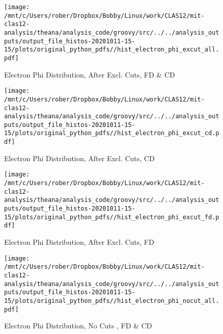 \documentclass{article}
\begin{document}
\begin{landscape}

    \begin{figure}[h]
        \centering

        \texttt{[image: /mnt/c/Users/rober/Dropbox/Bobby/Linux/work/CLAS12/mit-clas12-analysis/theana/analysis\_code/groovy/src/../../analysis\_outputs/output\_file\_histos-20201011-15-15/plots/original\_python\_pdfs//hist\_electron\_phi\_excut\_all.pdf]}
        \captionsetup{textformat=empty,labelformat=blank}
        \caption{Electron Phi Distribution, After Excl. Cuts, FD \& CD}
    \end{figure}
    \clearpage
    
    \begin{figure}[h]
        \centering

        \texttt{[image: /mnt/c/Users/rober/Dropbox/Bobby/Linux/work/CLAS12/mit-clas12-analysis/theana/analysis\_code/groovy/src/../../analysis\_outputs/output\_file\_histos-20201011-15-15/plots/original\_python\_pdfs//hist\_electron\_phi\_excut\_cd.pdf]}
        \captionsetup{textformat=empty,labelformat=blank}
        \caption{Electron Phi Distribution, After Excl. Cuts, CD}
    \end{figure}
    \clearpage
    
    \begin{figure}[h]
        \centering

        \texttt{[image: /mnt/c/Users/rober/Dropbox/Bobby/Linux/work/CLAS12/mit-clas12-analysis/theana/analysis\_code/groovy/src/../../analysis\_outputs/output\_file\_histos-20201011-15-15/plots/original\_python\_pdfs//hist\_electron\_phi\_excut\_fd.pdf]}
        \captionsetup{textformat=empty,labelformat=blank}
        \caption{Electron Phi Distribution, After Excl. Cuts, FD}
    \end{figure}
    \clearpage
    
    \begin{figure}[h]
        \centering

        \texttt{[image: /mnt/c/Users/rober/Dropbox/Bobby/Linux/work/CLAS12/mit-clas12-analysis/theana/analysis\_code/groovy/src/../../analysis\_outputs/output\_file\_histos-20201011-15-15/plots/original\_python\_pdfs//hist\_electron\_phi\_nocut\_all.pdf]}
        \captionsetup{textformat=empty,labelformat=blank}
        \caption{Electron Phi Distribution, No Cuts , FD \& CD}
    \end{figure}
    \clearpage
    
    \begin{figure}[h]
        \centering


\end{figure}
\end{landscape}
\end{document}
